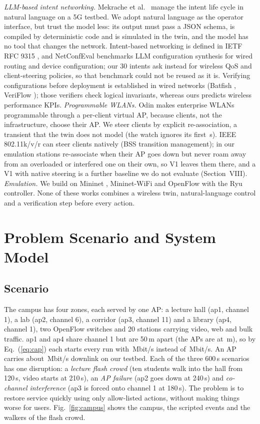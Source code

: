 \documentclass[conference]{IEEEtran}
\begin{document}
\emph{LLM-based intent networking.} Mekrache et al.\ \cite{mekrache2024} manage the intent life cycle in natural language on a 5G testbed. We adopt natural language as the operator interface, but trust the model less: its output must pass a JSON schema, is compiled by deterministic code and is simulated in the twin, and the model has no tool that changes the network. Intent-based networking is defined in IETF RFC 9315 \cite{clemm2022}, and NetConfEval \cite{wang2024} benchmarks LLM configuration synthesis for wired routing and device configuration; our 30 intents ask instead for wireless QoS and client-steering policies, so that benchmark could not be reused as it is. Verifying configurations before deployment is established in wired networks (Batfish \cite{fogel2015}, VeriFlow \cite{khurshid2013}); those verifiers check logical invariants, whereas ours predicts wireless performance KPIs.
\emph{Programmable WLANs.} Odin \cite{suresh2012} makes enterprise WLANs programmable through a per-client virtual AP, because clients, not the infrastructure, choose their AP. We steer clients by explicit re-association, a transient that the twin does not model (the watch ignores its first \CfgSettle\,s). IEEE 802.11k/v/r \cite{ieee80211} can steer clients natively (BSS transition management); in our emulation stations re-associate when their AP goes down but never roam away from an overloaded or interfered one on their own, so V1 leaves them there, and a V1 with native steering is a further baseline we do not evaluate (Section~VIII).
\emph{Emulation.} We build on Mininet \cite{lantz2010}, Mininet-WiFi \cite{fontes2015} and OpenFlow \cite{mckeown2008} with the Ryu controller.
None of these works combines a wireless twin, natural-language control and a verification step before every action.

\section{Problem Scenario and System Model}
\subsection{Scenario}
The campus has four zones, each served by one AP: a lecture hall (ap1, channel 1), a lab (ap2, channel 6), a corridor (ap3, channel 11) and a library (ap4, channel 1), two OpenFlow switches and 20 stations carrying video, web and bulk traffic. ap1 and ap4 share channel 1 but are 50\,m apart (the APs are at \CfgApPlaces\,m), so by Eq.~(\ref{eq:cap}) each starts every run with \CfgSharedCapacity\,Mbit/s instead of \CfgCapacity\,Mbit/s. An AP carries about \CfgCapacity\,Mbit/s downlink on our testbed. Each of the three 600\,s scenarios has one disruption: a \emph{lecture flash crowd} (ten students walk into the hall from 120\,s, video starts at 210\,s), an \emph{AP failure} (ap2 goes down at 240\,s) and \emph{co-channel interference} (ap3 is forced onto channel 1 at 180\,s). The problem is to restore service quickly using only allow-listed actions, without making things worse for users. Fig.~\ref{fig:campus} shows the campus, the scripted events and the walkers of the flash crowd.
\end{document}
